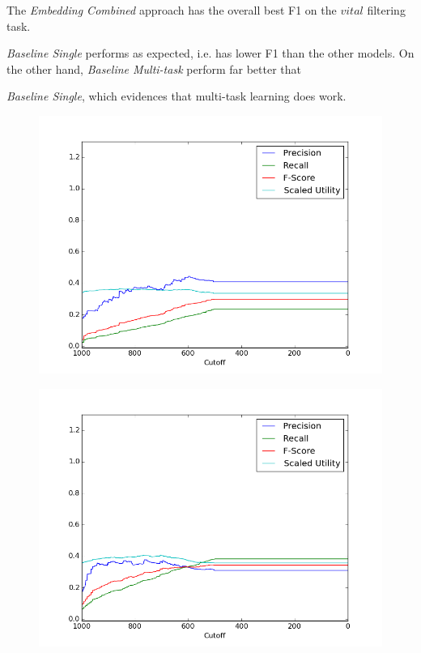 \documentclass{article}
\begin{document}
The {\textit{Embedding Combined}} approach has the overall best F1 on the $vital$ filtering task. {\textit{Baseline Single} performs as expected, i.e. has lower F1 than the other models. On the other hand, {\textit{Baseline Multi-task}} perform far better that {\textit{Baseline Single}, which evidences that multi-task learning does work.

\begin{figure}[h!]
\begin{minipage}{.25\textwidth}
  \centering
  \includegraphics[width=1\linewidth]{fig/official/f_basic_single.png}
  \label{fig:basic_single}
\end{minipage}%
\begin{minipage}{.25\textwidth}
  \centering
  \includegraphics[width=1\linewidth]{fig/official/f_basic_multi.png}

\end{minipage}
\end{figure}}}
\end{document}
